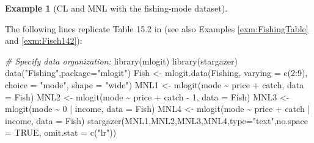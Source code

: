 \documentclass[
  12pt,
]{book}
\newenvironment{Shaded}{\begin{snugshade}}{\end{snugshade}}
\newcommand{\AttributeTok}[1]{\textcolor[rgb]{0.77,0.63,0.00}{#1}}
\newcommand{\CommentTok}[1]{\textcolor[rgb]{0.56,0.35,0.01}{\textit{#1}}}
\newcommand{\ConstantTok}[1]{\textcolor[rgb]{0.00,0.00,0.00}{#1}}
\newcommand{\DecValTok}[1]{\textcolor[rgb]{0.00,0.00,0.81}{#1}}
\newcommand{\FunctionTok}[1]{\textcolor[rgb]{0.00,0.00,0.00}{#1}}
\newcommand{\NormalTok}[1]{#1}
\newcommand{\OtherTok}[1]{\textcolor[rgb]{0.56,0.35,0.01}{#1}}
\newcommand{\SpecialCharTok}[1]{\textcolor[rgb]{0.00,0.00,0.00}{#1}}
\newcommand{\StringTok}[1]{\textcolor[rgb]{0.31,0.60,0.02}{#1}}
\theoremstyle{definition}
\theoremstyle{definition}
\newtheorem{example}{Example}[chapter]
\theoremstyle{definition}
\theoremstyle{definition}
\theoremstyle{remark}
\begin{document}
\begin{example}[CL and MNL with the fishing-mode dataset]
\protect\hypertarget{exm:FishingGeneralLogit}{}\label{exm:FishingGeneralLogit}

The following lines replicate Table 15.2 in \citet{Cameron_Trivedi_2005} (see also Examples \ref{exm:FishingTable} and \ref{exm:Fisch142}):

\begin{Shaded}
\begin{Highlighting}[]
\CommentTok{\# Specify data organization:}
\FunctionTok{library}\NormalTok{(mlogit)}
\FunctionTok{library}\NormalTok{(stargazer)}
\FunctionTok{data}\NormalTok{(}\StringTok{"Fishing"}\NormalTok{,}\AttributeTok{package=}\StringTok{"mlogit"}\NormalTok{)}
\NormalTok{Fish }\OtherTok{\textless{}{-}} \FunctionTok{mlogit.data}\NormalTok{(Fishing,}
                    \AttributeTok{varying =} \FunctionTok{c}\NormalTok{(}\DecValTok{2}\SpecialCharTok{:}\DecValTok{9}\NormalTok{),}
                    \AttributeTok{choice =} \StringTok{"mode"}\NormalTok{,}
                    \AttributeTok{shape =} \StringTok{"wide"}\NormalTok{)}
\NormalTok{MNL1 }\OtherTok{\textless{}{-}} \FunctionTok{mlogit}\NormalTok{(mode }\SpecialCharTok{\textasciitilde{}}\NormalTok{ price }\SpecialCharTok{+}\NormalTok{ catch, }\AttributeTok{data =}\NormalTok{ Fish)}
\NormalTok{MNL2 }\OtherTok{\textless{}{-}} \FunctionTok{mlogit}\NormalTok{(mode }\SpecialCharTok{\textasciitilde{}}\NormalTok{ price }\SpecialCharTok{+}\NormalTok{ catch }\SpecialCharTok{{-}} \DecValTok{1}\NormalTok{, }\AttributeTok{data =}\NormalTok{ Fish)}
\NormalTok{MNL3 }\OtherTok{\textless{}{-}} \FunctionTok{mlogit}\NormalTok{(mode }\SpecialCharTok{\textasciitilde{}} \DecValTok{0} \SpecialCharTok{|}\NormalTok{ income, }\AttributeTok{data =}\NormalTok{ Fish)}
\NormalTok{MNL4 }\OtherTok{\textless{}{-}} \FunctionTok{mlogit}\NormalTok{(mode }\SpecialCharTok{\textasciitilde{}}\NormalTok{ price }\SpecialCharTok{+}\NormalTok{ catch }\SpecialCharTok{|}\NormalTok{ income, }\AttributeTok{data =}\NormalTok{ Fish)}
\FunctionTok{stargazer}\NormalTok{(MNL1,MNL2,MNL3,MNL4,}\AttributeTok{type=}\StringTok{"text"}\NormalTok{,}\AttributeTok{no.space =} \ConstantTok{TRUE}\NormalTok{,}
          \AttributeTok{omit.stat =} \FunctionTok{c}\NormalTok{(}\StringTok{"lr"}\NormalTok{))}
\end{Highlighting}
\end{Shaded}


\end{example}
\end{document}
